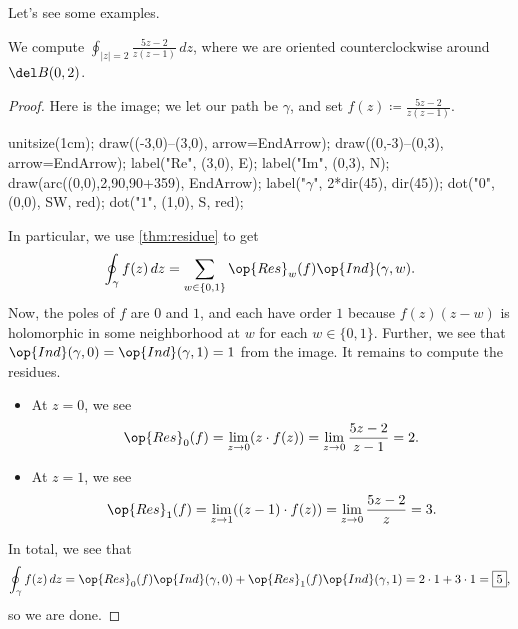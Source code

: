 Let's see some examples.
\begin{exe}
	We compute $\oint_{|z|=2}\frac{5z-2}{z(z-1)}\,dz$, where we are oriented counterclockwise around $\del B(0,2)$.
\end{exe}
\begin{proof}
	Here is the image; we let our path be $\gamma$, and set $f(z)\coloneqq \frac{5z-2}{z(z-1)}$.
	\begin{center}
		\begin{asy}
			unitsize(1cm);
			draw((-3,0)--(3,0), arrow=EndArrow);
			draw((0,-3)--(0,3), arrow=EndArrow);
			label("$\textrm{Re}$", (3,0), E);
			label("$\textrm{Im}$", (0,3), N);
			draw(arc((0,0),2,90,90+359), EndArrow);
			label("$\gamma$", 2*dir(45), dir(45));
			dot("$0$", (0,0), SW, red);
			dot("$1$", (1,0), S, red);
		\end{asy}
	\end{center}
	In particular, we use \autoref{thm:residue} to get
	\[\oint_{\gamma}f(z)\,dz=\sum_{w\in\{0,1\}}\op{Res}_w(f)\op{Ind}(\gamma,w).\]
	Now, the poles of $f$ are $0$ and $1$, and each have order $1$ because $f(z)(z-w)$ is holomorphic in some neighborhood at $w$ for each $w\in\{0,1\}$. Further, we see that $\op{Ind}(\gamma,0)=\op{Ind}(\gamma,1)=1$ from the image. It remains to compute the residues.
	\begin{itemize}
		\item At $z=0$, we see
		\[\op{Res}_0(f)=\lim_{z\to0}(z\cdot f(z))=\lim_{z\to0}\frac{5z-2}{z-1}=2.\]
		\item At $z=1$, we see
		\[\op{Res}_1(f)=\lim_{z\to1}((z-1)\cdot f(z))=\lim_{z\to0}\frac{5z-2}z=3.\]
	\end{itemize}
	In total, we see that
	\[\oint_\gamma f(z)\,dz=\op{Res}_0(f)\op{Ind}(\gamma,0)+\op{Res}_1(f)\op{Ind}(\gamma,1)=2\cdot1+3\cdot1=\boxed5,\]
	so we are done.
\end{proof}